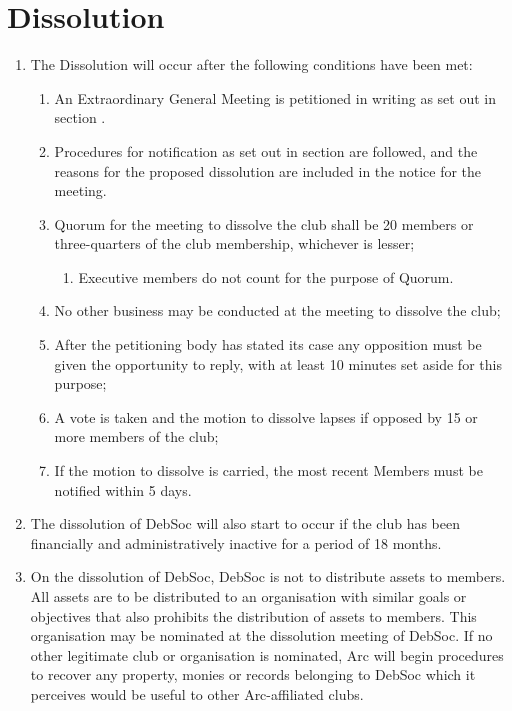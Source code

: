 \newpage
\section{Dissolution}

\begin{enumerate}
\item The Dissolution will occur after the following conditions have been met:
  \begin{enumerate}
  \item An Extraordinary General Meeting is petitioned in writing as set out in section .
  \item Procedures for notification as set out in section  are followed, and the reasons for the proposed dissolution are included in the notice for the meeting.
  \item Quorum for the meeting to dissolve the club shall be 20 members or three-quarters of the club membership, whichever is lesser;
    \begin{enumerate}
    \item Executive members do not count for the purpose of Quorum.
    \end{enumerate}
  \item No other business may be conducted at the meeting to dissolve the club;
  \item After the petitioning body has stated its case any opposition must be given the opportunity to reply, with at least 10 minutes set aside for this purpose;
  \item A vote is taken and the motion to dissolve lapses if opposed by 15 or more members of the club;
  \item If the motion to dissolve is carried, the most recent Members must be notified within 5 days.
  \end{enumerate}
\item The dissolution of DebSoc will also start to occur if the club has been financially and administratively inactive for a period of 18 months.
\item On the dissolution of DebSoc, DebSoc is not to distribute assets to members. All assets are to be distributed to an organisation with similar goals or objectives that also prohibits the distribution of assets to members. This organisation may be nominated at the dissolution meeting of DebSoc. If no other legitimate club or organisation is nominated, Arc will begin procedures to recover any property, monies or records belonging to DebSoc which it perceives would be useful to other Arc-affiliated clubs.
\end{enumerate}
